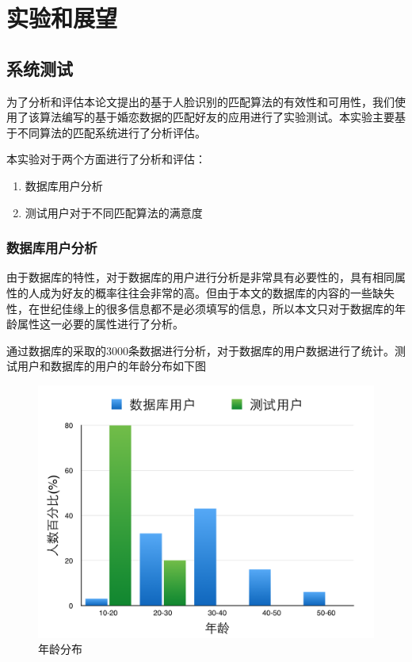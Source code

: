 
\chapter{实验和展望}
\section{系统测试}
为了分析和评估本论文提出的基于人脸识别的匹配算法的有效性和可用性，我们使用了该算法编写的基于婚恋数据的匹配好友的应用进行了实验测试。本实验主要基于不同算法的匹配系统进行了分析评估。

本实验对于两个方面进行了分析和评估：
\begin{enumerate}
\item 数据库用户分析
\item 测试用户对于不同匹配算法的满意度
\end{enumerate}

\subsection{数据库用户分析}
由于数据库的特性，对于数据库的用户进行分析是非常具有必要性的，具有相同属性的人成为好友的概率往往会非常的高。但由于本文的数据库的内容的一些缺失性，在世纪佳缘上的很多信息都不是必须填写的信息，所以本文只对于数据库的年龄属性这一必要的属性进行了分析。

通过数据库的采取的3000条数据进行分析，对于数据库的用户数据进行了统计。测试用户和数据库的用户的年龄分布如下图
\begin{figure}[h] 
\begin{minipage}[t]{\linewidth}

\centering

\includegraphics[width=\textwidth]{img/chap5/exp1.png}
\caption{年龄分布\label{instagram}}
\end{minipage}
\end{figure}

